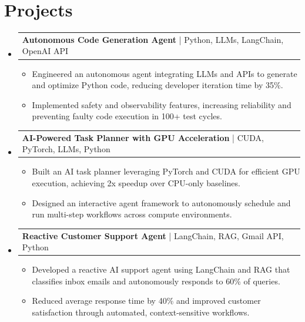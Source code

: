 \documentclass[letterpaper,11pt]{article}
\makeatletter
\newcommand{\resumeItem}[1]{
  \item\footnotesize{
    {#1 \vspace{-2pt}}
  }
}
\newcommand{\resumeProjectHeading}[2]{
    \item
    \begin{tabular*}{1.001\textwidth}{l@{\extracolsep{\fill}}r}
      \small#1 & \textbf{\small #2}\\
    \end{tabular*}\vspace{-7pt}
}
\newcommand{\resumeSubHeadingListStart}{\begin{itemize}[leftmargin=0pt, label={}]}
\newcommand{\resumeSubHeadingListEnd}{\end{itemize}}
\newcommand{\resumeItemListStart}{\begin{itemize}[leftmargin=*]}
\newcommand{\resumeItemListEnd}{\end{itemize}\vspace{-5pt}}
\makeatother
\begin{document}
\section{Projects}
    \vspace{-5pt}
    \resumeSubHeadingListStart
          \resumeProjectHeading
              {\textbf{Autonomous Code Generation Agent} | Python, LLMs, LangChain, OpenAI API}{}
        \resumeItemListStart
            \resumeItem{Engineered an autonomous agent integrating LLMs and APIs to generate and optimize Python code, reducing developer iteration time by 35\%.}
            \resumeItem{Implemented safety and observability features, increasing reliability and preventing faulty code execution in 100+ test cycles.}
        \resumeItemListEnd
        \vspace{-12pt}
    
    \resumeProjectHeading
        {\textbf{AI-Powered Task Planner with GPU Acceleration} | CUDA, PyTorch, LLMs, Python}{}
        \resumeItemListStart
            \resumeItem{Built an AI task planner leveraging PyTorch and CUDA for efficient GPU execution, achieving 2x speedup over CPU-only baselines.}
            \resumeItem{Designed an interactive agent framework to autonomously schedule and run multi-step workflows across compute environments.}
        \resumeItemListEnd
          \vspace{-12pt}
      
      \resumeProjectHeading
          {\textbf{Reactive Customer Support Agent} | LangChain, RAG, Gmail API, Python}{}
          \resumeItemListStart
              \resumeItem{Developed a reactive AI support agent using LangChain and RAG that classifies inbox emails and autonomously responds to 60\% of queries.}
              \resumeItem{Reduced average response time by 40\% and improved customer satisfaction through automated, context-sensitive workflows.}
          \resumeItemListEnd 
    \resumeSubHeadingListEnd
\end{document}
